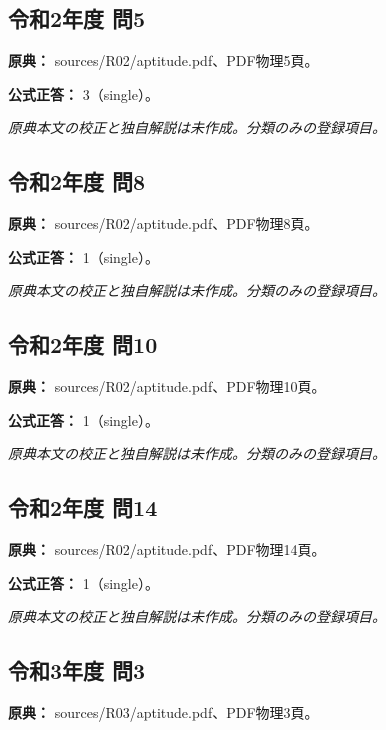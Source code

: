 \subsection{令和2年度 問5}
\label{q:r02-reg-apt-05}

\noindent\textbf{原典：} sources/R02/aptitude.pdf、PDF物理5頁。

\textbf{公式正答：} 3（single）。

\par\textit{原典本文の校正と独自解説は未作成。分類のみの登録項目。}

\subsection{令和2年度 問8}
\label{q:r02-reg-apt-08}

\noindent\textbf{原典：} sources/R02/aptitude.pdf、PDF物理8頁。

\textbf{公式正答：} 1（single）。

\par\textit{原典本文の校正と独自解説は未作成。分類のみの登録項目。}

\subsection{令和2年度 問10}
\label{q:r02-reg-apt-10}

\noindent\textbf{原典：} sources/R02/aptitude.pdf、PDF物理10頁。

\textbf{公式正答：} 1（single）。

\par\textit{原典本文の校正と独自解説は未作成。分類のみの登録項目。}

\subsection{令和2年度 問14}
\label{q:r02-reg-apt-14}

\noindent\textbf{原典：} sources/R02/aptitude.pdf、PDF物理14頁。

\textbf{公式正答：} 1（single）。

\par\textit{原典本文の校正と独自解説は未作成。分類のみの登録項目。}

\subsection{令和3年度 問3}
\label{q:r03-reg-apt-03}

\noindent\textbf{原典：} sources/R03/aptitude.pdf、PDF物理3頁。

